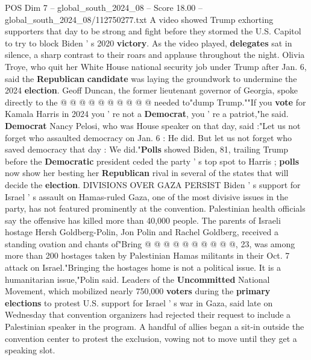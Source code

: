 \begin{textsample}{POS Dim 7 – global\_south\_2024\_08 – Score 18.00 – global\_south\_2024\_08/112750277.txt}
A video showed Trump exhorting supporters that day to be strong and fight before they stormed the U.S.
Capitol to try to block Biden ' s 2020 \textbf{victory}.
As the video played, \textbf{delegates} sat in silence, a sharp contrast to their roars and applause throughout the night.
Olivia Troye, who quit her White House national security job under Trump after Jan. 6, said the \textbf{Republican} \textbf{candidate} was laying the groundwork to undermine the 2024 \textbf{election}.
Geoff Duncan, the former lieutenant governor of Georgia, spoke directly to the @ @ @ @ @ @ @ @ @ @ needed to"dump Trump.""If you \textbf{vote} for Kamala Harris in 2024 you ' re not a \textbf{Democrat}, you ' re a patriot,"he said. \textbf{Democrat} Nancy Pelosi, who was House speaker on that day, said :"Let us not forget who assaulted democracy on Jan. 6 : He did.
But let us not forget who saved democracy that day : We did."\textbf{Polls} showed Biden, 81, trailing Trump before the \textbf{Democratic} president ceded the party ' s top spot to Harris ; \textbf{polls} now show her besting her \textbf{Republican} rival in several of the states that will decide the \textbf{election}.
DIVISIONS OVER GAZA PERSIST Biden ' s support for Israel ' s assault on Hamas-ruled Gaza, one of the most divisive issues in the party, has not featured prominently at the convention.
Palestinian health officials say the offensive has killed more than 40,000 people.
The parents of Israeli hostage Hersh Goldberg-Polin, Jon Polin and Rachel Goldberg, received a standing ovation and chants of"Bring @ @ @ @ @ @ @ @ @ @, 23, was among more than 200 hostages taken by Palestinian Hamas militants in their Oct. 7 attack on Israel."Bringing the hostages home is not a political issue.
It is a humanitarian issue,"Polin said.
Leaders of the \textbf{Uncommitted} National Movement, which mobilized nearly 750,000 \textbf{voters} during the \textbf{primary} \textbf{elections} to protest U.S. support for Israel ' s war in Gaza, said late on Wednesday that convention organizers had rejected their request to include a Palestinian speaker in the program.
A handful of allies began a sit-in outside the convention center to protest the exclusion, vowing not to move until they get a speaking slot.

\end{textsample}
